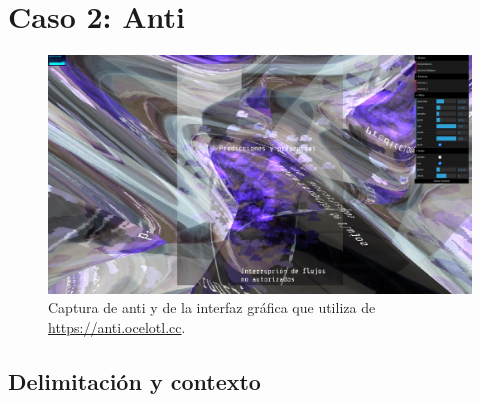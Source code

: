 \chapter{Caso 2: Anti}



\begin{figure}[tb]
\centering 
\includegraphics[width=\columnwidth]{../../img/anti01.png} 
\caption[Captura de Anti]{Captura de anti y de la interfaz gráfica que utiliza de \url{https://anti.ocelotl.cc}.} %
\label{fig:gallery} 
\end{figure}





\section{Delimitación y contexto}



